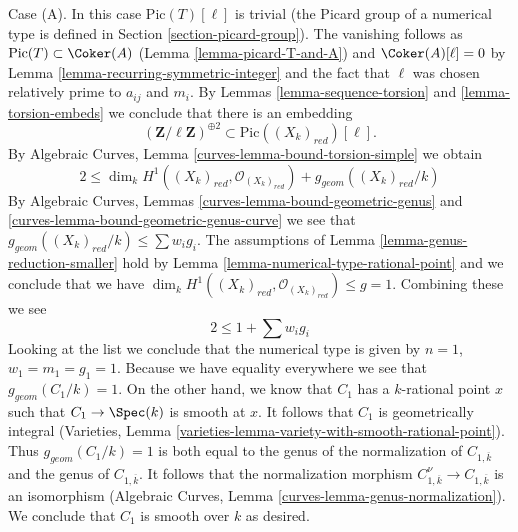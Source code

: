 \medskip\noindent
Case (A). In this case $\text{Pic}(T)[\ell]$ is trivial (the Picard group
of a numerical type is defined in Section \ref{section-picard-group}).
The vanishing follows as $\text{Pic}(T) \subset \Coker(A)$
(Lemma \ref{lemma-picard-T-and-A}) and $\Coker(A)[\ell] = 0$ by
Lemma \ref{lemma-recurring-symmetric-integer} and the
fact that $\ell$ was chosen relatively prime to $a_{ij}$ and $m_i$.
By Lemmas \ref{lemma-sequence-torsion} and \ref{lemma-torsion-embeds}
we conclude that there is an embedding
$$
(\mathbf{Z}/\ell \mathbf{Z})^{\oplus 2} \subset \text{Pic}((X_k)_{red})[\ell].
$$
By Algebraic Curves, Lemma \ref{curves-lemma-bound-torsion-simple} we obtain
$$
2 \leq \dim_k H^1((X_k)_{red}, \mathcal{O}_{(X_k)_{red}}) +
g_{geom}((X_k)_{red}/k)
$$
By Algebraic Curves, Lemmas \ref{curves-lemma-bound-geometric-genus} and
\ref{curves-lemma-bound-geometric-genus-curve}
we see that $g_{geom}((X_k)_{red}/k) \leq \sum w_ig_i$.
The assumptions of Lemma \ref{lemma-genus-reduction-smaller}
hold by Lemma \ref{lemma-numerical-type-rational-point} and we
conclude that we have
$\dim_k H^1((X_k)_{red}, \mathcal{O}_{(X_k)_{red}}) \leq g = 1$.
Combining these we see
$$
2 \leq 1 + \sum w_i g_i
$$
Looking at the list we conclude that the numerical type is given by
$n = 1$, $w_1 = m_1 = g_1 = 1$. Because we have equality everywhere
we see that $g_{geom}(C_1/k) = 1$. On the other hand, we know
that $C_1$ has a $k$-rational point $x$ such that $C_1 \to \Spec(k)$
is smooth at $x$. It follows that $C_1$ is geometrically integral
(Varieties, Lemma \ref{varieties-lemma-variety-with-smooth-rational-point}).
Thus $g_{geom}(C_1/k) = 1$ is both equal to the genus of the normalization
of $C_{1, \overline{k}}$ and the genus of $C_{1, \overline{k}}$.
It follows that the normalization morphism
$C_{1, \overline{k}}^\nu \to C_{1, \overline{k}}$
is an isomorphism
(Algebraic Curves, Lemma \ref{curves-lemma-genus-normalization}).
We conclude that $C_1$ is smooth over $k$ as desired.

